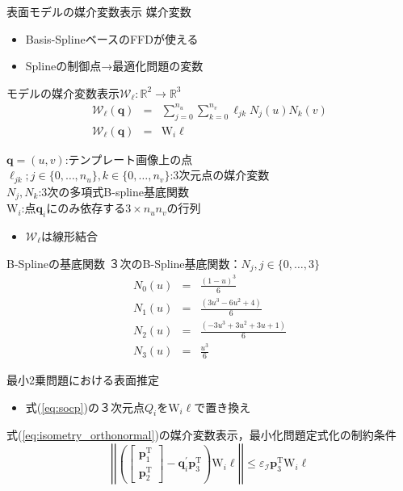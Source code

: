 \documentclass[dvipdfmx]{beamer}
\def\eqref#1{式(\ref{#1})}
\begin{document}
  \begin{frame}{表面モデルの媒介変数表示}
      媒介変数
      \begin{itemize}
          \item Basis-SplineベースのFFDが使える
          \item Splineの制御点→最適化問題の変数
      \end{itemize}
      モデルの媒介変数表示$\mathcal{W}_{\bm{\ell}}: \mathbb{R}^2 \to \mathbb{R}^3$
      \begin{eqnarray}
          \mathcal{W}_{\bm{\ell}}(\mathrm{\bm{q}}) &=& \sum_{j=0}^{n_u}\sum_{k=0}^{n_v} \bm{\ell}_{jk}N_j(u)N_k(v) \\
          \mathcal{W}_{\bm{\ell}}(\mathrm{\bm{q}}) &=& \mathrm{W}_i\bm{\ell}
      \end{eqnarray}

    $\mathrm{\bm{q}} = (u, v)$:テンプレート画像上の点 \\
    $\bm{\ell}_{jk}; j \in \{0, \dots, n_u\}, k \in \{0, \dots, n_v\}$:3次元点の媒介変数 \\
    $N_{j},N_{k}$:3次の多項式B-spline基底関数 \\
    $\mathrm{W}_i$:点$\mathrm{\bm{q}}_i$にのみ依存する$3\times n_u n_v$の行列

    \begin{itemize}
        \item $\mathcal{W}_{\bm{\ell}}$は線形結合
    \end{itemize}
  \end{frame}
  \begin{frame}{B-Splineの基底関数\cite{Rueckert1999}}
      ３次のB-Spline基底関数：$N_j,j\in\{0,\dots,3\}$
      \begin{eqnarray}
          N_0(u) &=& \frac{(1-u)^3}{6} \\
          N_1(u) &=& \frac{(3u^3-6u^2+4)}{6} \\
          N_2(u) &=& \frac{(-3u^3+3u^2+3u+1)}{6} \\
          N_3(u) &=& \frac{u^3}{6}
      \end{eqnarray}
  \end{frame}
  \begin{frame}{最小2乗問題における表面推定}
      \begin{itemize}
          \item \eqref{eq:socp}の３次元点$Q_i$を$\mathrm{W}_i\bm{\ell}$で置き換え
      \end{itemize}
      \eqref{eq:isometry_orthonormal}の媒介変数表示，最小化問題定式化の制約条件
    \begin{equation}
        \left|\left|
        \left( 
            \left[
                \begin{array}{c}
                    \mathrm{\bm{p}}_1^{\mathrm{T}}  \\
                    \mathrm{\bm{p}}_2^{\mathrm{T}}
                \end{array}
            \right]
            - \bm{q}_i^{\prime}\mathrm{\bm{p}}_3^{\mathrm{T}} 
        \right)\mathrm{W}_i\bm{\ell}
        \right|\right|
        \le \varepsilon_{\mathcal{I}}\mathrm{\bm{p}}_3^{\mathrm{T}}\mathrm{W}_i\bm{\ell}
        \label{eq:constraint}
    \end{equation}
  \end{frame}
\end{document}

